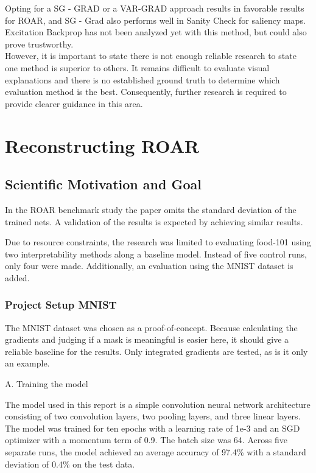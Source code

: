 Opting for a SG - GRAD or a VAR-GRAD approach results in favorable results for ROAR, and SG - Grad also performs well in Sanity Check for saliency maps. Excitation Backprop has not been analyzed yet with this method, but could also prove trustworthy. \\
However, it is important to state there is not enough reliable research to state one method is superior to others. It remains difficult to evaluate visual explanations and there is no established ground truth to determine which evaluation method is the best. Consequently, further research is required to provide clearer guidance in this area.



\chapter{Reconstructing ROAR} %
\label{sec:project}


\section{Scientific Motivation and Goal}
In the ROAR benchmark study \cite{hooker2019benchmark} the paper omits the standard deviation of the trained nets. A validation of the results is expected by achieving similar results.

Due to resource constraints, the research was limited to evaluating food-101 \cite{bossard14} using two interpretability methods along a baseline model. Instead of five control runs, only four were made. Additionally, an evaluation using the MNIST dataset is added.

\subsection{Project Setup MNIST}


The MNIST dataset \cite{deng2012mnist} was chosen as a proof-of-concept. Because calculating the gradients and judging if a mask is meaningful is easier here, it should give a reliable baseline for the results. Only integrated gradients are tested, as is it only an example.

A. Training the model

The model used in this report is a simple convolution neural network architecture consisting of two convolution layers, two pooling layers, and three linear layers. The model was trained for ten epochs with a learning rate of 1e-3 and an SGD optimizer with a momentum term of 0.9. The batch size was 64. Across five separate runs, the model achieved an average accuracy of 97.4\% with a standard deviation of 0.4\% on the test data.

